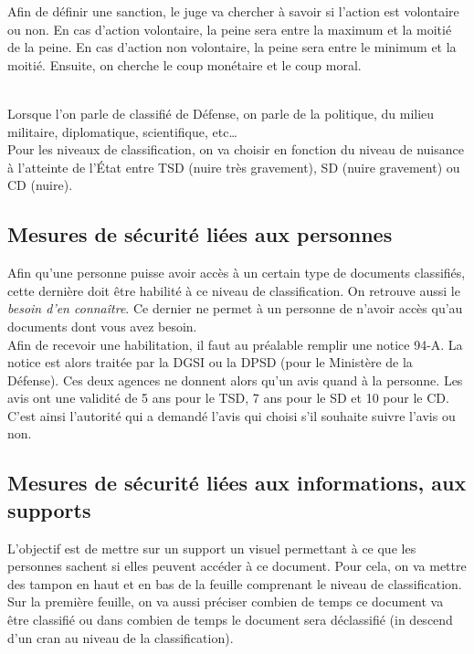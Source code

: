 Afin de définir une sanction, le juge va chercher à savoir si l'action est volontaire ou non. En cas d'action volontaire, la peine sera entre la maximum et la moitié de la peine. En cas d'action non volontaire, la peine sera entre le minimum et la moitié. Ensuite, on cherche le coup monétaire et le coup moral.\\~\\\par
Lorsque l'on parle de classifié de Défense, on parle de la politique, du milieu militaire, diplomatique, scientifique, etc\ldots\\
Pour les niveaux de classification, on va choisir en fonction du niveau de nuisance à l'atteinte de l’État entre TSD (nuire très gravement), SD (nuire gravement) ou CD (nuire).
\subsection{Mesures de sécurité liées aux personnes}
Afin qu'une personne puisse avoir accès à un certain type de documents classifiés, cette dernière doit être habilité à ce niveau de classification. On retrouve aussi le \textit{besoin d'en connaître}. Ce dernier ne permet à un personne de n'avoir accès qu'au documents dont vous avez besoin.\\
Afin de recevoir une habilitation, il faut au préalable remplir une notice 94-A. La notice est alors traitée par la DGSI ou la DPSD (pour le Ministère de la Défense). Ces deux agences ne donnent alors qu'un avis quand à la personne. Les avis ont une validité de 5 ans pour le TSD, 7 ans pour le SD et 10 pour le CD. C'est ainsi l'autorité qui a demandé l'avis qui choisi s'il souhaite suivre l'avis ou non.
\subsection{Mesures de sécurité liées aux informations, aux supports}
L'objectif est de mettre sur un support un visuel permettant à ce que les personnes sachent si elles peuvent accéder à ce document. Pour cela, on va mettre des tampon en haut et en bas de la feuille comprenant le niveau de classification. Sur la première feuille, on va aussi préciser combien de temps ce document va être classifié ou dans combien de temps le document sera déclassifié (in descend d'un cran au niveau de la classification).
